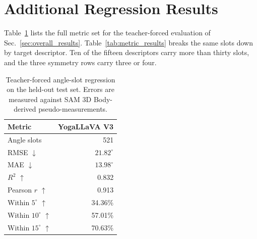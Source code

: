 \documentclass[conference]{IEEEtran}
\begin{document}
\section{Additional Regression Results}
\label{app:additional_results}

Table~\ref{tab:overall_results} lists the full metric set for the teacher-forced evaluation of Sec.~\ref{sec:overall_results}.
Table~\ref{tab:metric_results} breaks the same slots down by target descriptor.
Ten of the fifteen descriptors carry more than thirty slots, and the three symmetry rows carry three or four.

\begin{table}[h]
    \centering
    \caption{Teacher-forced angle-slot regression on the held-out test set.
    Errors are measured against SAM 3D Body-derived pseudo-measurements.}
    \label{tab:overall_results}
    \begin{tabular}{lr}
        \toprule
        \textbf{Metric} & \textbf{YogaLLaVA V3} \\
        \midrule
        Angle slots & 521 \\
        RMSE $\downarrow$ & $21.82^\circ$ \\
        MAE $\downarrow$ & $13.98^\circ$ \\
        $R^2$ $\uparrow$ & 0.832 \\
        Pearson $r$ $\uparrow$ & 0.913 \\
        Within $5^\circ$ $\uparrow$ & 34.36\% \\
        Within $10^\circ$ $\uparrow$ & 57.01\% \\
        Within $15^\circ$ $\uparrow$ & 70.63\% \\
        \bottomrule
    \end{tabular}
\end{table}
\end{document}
